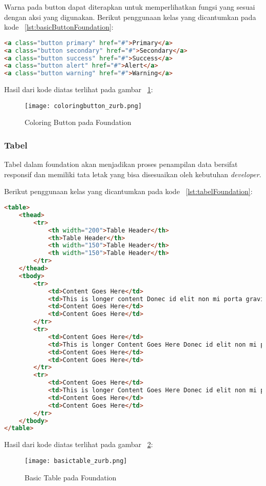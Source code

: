 \noindent Warna pada button dapat diterapkan untuk memperlihatkan fungsi yang sesuai dengan aksi yang digunakan. Berikut penggunaan kelas yang dicantumkan pada kode ~\ref{lst:basicButtonFoundation}:
\begin{lstlisting}[style=customhtml, language=HTML,  basicstyle=\ttfamily, frame=single, columns=fullflexible, keepspaces=true, breaklines=true, showstringspaces=false, label={lst:basicButtonFoundation}, caption=Basic Button pada foundation 6.] 
<a class="button primary" href="#">Primary</a>
<a class="button secondary" href="#">Secondary</a>
<a class="button success" href="#">Success</a>
<a class="button alert" href="#">Alert</a>
<a class="button warning" href="#">Warning</a>
\end{lstlisting}

\noindent Hasil dari kode diatas terlihat pada gambar ~\ref{fig:colorButtonFoundation}:
\begin{figure} [H]
	\centering  
	\texttt{[image: coloringbutton\_zurb.png]}  
	\caption{Coloring Button pada Foundation}
	\label{fig:colorButtonFoundation}
\end{figure}

\subsubsection{Tabel}

Tabel dalam foundation akan menjadikan proses penampilan data bersifat responsif dan memiliki tata letak yang bisa disesuaikan oleh kebutuhan \textit{developer}.

Berikut penggunaan kelas yang dicantumkan pada kode ~\ref{lst:tabelFoundation}:
\begin{lstlisting}[style=customhtml, language=HTML,  basicstyle=\ttfamily, frame=single, columns=fullflexible, keepspaces=true, breaklines=true, showstringspaces=false, label={lst:tabelFoundation}, caption=Tabel pada foundation 6.]  
<table>
	<thead>
		<tr>
			<th width="200">Table Header</th>
			<th>Table Header</th>
			<th width="150">Table Header</th>
			<th width="150">Table Header</th>
		</tr>
	</thead>
	<tbody>
		<tr>
			<td>Content Goes Here</td>
			<td>This is longer content Donec id elit non mi porta gravida at eget metus.</td>
			<td>Content Goes Here</td>
			<td>Content Goes Here</td>
		</tr>
		<tr>
			<td>Content Goes Here</td>
			<td>This is longer Content Goes Here Donec id elit non mi porta gravida at eget metus.</td>
			<td>Content Goes Here</td>
			<td>Content Goes Here</td>
		</tr>
		<tr>
			<td>Content Goes Here</td>
			<td>This is longer Content Goes Here Donec id elit non mi porta gravida at eget metus.</td>
			<td>Content Goes Here</td>
			<td>Content Goes Here</td>
		</tr>
	</tbody>
</table>
\end{lstlisting}
\noindent Hasil dari kode diatas terlihat pada gambar ~\ref{fig:tableFoundation}:
\begin{figure} [H]
	\centering  
	\texttt{[image: basictable\_zurb.png]}  
	\caption{Basic Table pada Foundation}
	\label{fig:tableFoundation}
\end{figure}

